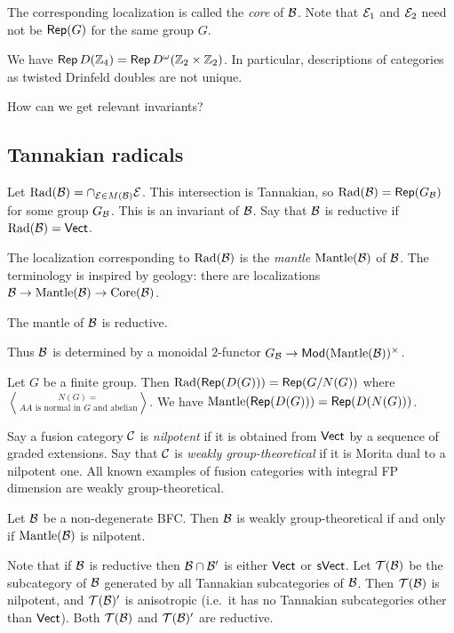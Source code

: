 \documentclass{amsart}
\begin{document}
The corresponding localization is called the \emph{core} of $\mathcal{B}$.
Note that $\mathcal{E}_1$ and $\mathcal{E}_2$ need not be $\operatorname{\mathsf{Rep}}(G)$ for the same group $G$.

\begin{ex}
  We have $\operatorname{\mathsf{Rep}} D(\mathbb{Z}_4) = \operatorname{\mathsf{Rep}} D^\omega(\mathbb{Z}_2 \times \mathbb{Z}_2)$.
  In particular, descriptions of categories as twisted Drinfeld doubles are not unique.
\end{ex}

How can we get relevant invariants?

\subsection{Tannakian radicals}

Let $\operatorname{Rad}(\mathcal{B}) = \cap_{\mathcal{E} \in M(\mathcal{B})} \mathcal{E}$.
This intersection is Tannakian, so $\operatorname{Rad}(\mathcal{B}) = \operatorname{\mathsf{Rep}}(G_{\mathcal{B}})$ for some group $G_{\mathcal{B}}$.
This is an invariant of $\mathcal{B}$.
Say that $\mathcal{B}$ is reductive if $\operatorname{Rad}(\mathcal{B}) = \mathsf{Vect}$.

The localization corresponding to $\operatorname{Rad}(\mathcal{B})$ is the \emph{mantle} $\operatorname{Mantle}(\mathcal{B})$ of $\mathcal{B}$.
The terminology is inspired by geology: there are localizations $\mathcal{B} \to \operatorname{Mantle}(\mathcal{B}) \to \operatorname{Core}(\mathcal{B})$.

\begin{thm}
  The mantle of $\mathcal{B}$ is reductive.
\end{thm}

Thus $\mathcal{B}$ is determined by a monoidal $2$-functor $G_{\mathcal{B}} \to \mathsf{Mod}(\operatorname{Mantle}(\mathcal{B}))^\times$.

\begin{ex}
  Let $G$ be a finite group.
  Then $\operatorname{Rad}(\operatorname{\mathsf{Rep}}(D(G))) = \operatorname{\mathsf{Rep}}(G / N(G))$ where $N(G) = \bangle{A}{A \textrm{ is normal in $G$ and abelian}}$.
  We have $\operatorname{Mantle}(\operatorname{\mathsf{Rep}}(D(G))) = \operatorname{\mathsf{Rep}}(D(N(G)))$.
\end{ex}

Say a fusion category $\mathcal{C}$ is \emph{nilpotent} if it is obtained from $\mathsf{Vect}$ by a sequence of graded extensions.
Say that $\mathcal{C}$ is \emph{weakly group-theoretical} if it is Morita dual to a nilpotent one.
All known examples of fusion categories with integral FP dimension are weakly group-theoretical.

\begin{thm}
  Let $\mathcal{B}$ be a non-degenerate BFC.
  Then $\mathcal{B}$ is weakly group-theoretical if and only if $\operatorname{Mantle}(\mathcal{B})$ is nilpotent.
\end{thm}

Note that if $\mathcal{B}$ is reductive then $\mathcal{B} \cap \mathcal{B}'$ is either $\mathsf{Vect}$ or $\mathsf{sVect}$.
Let $\mathcal{T}(\mathcal{B})$ be the subcategory of $\mathcal{B}$ generated by all Tannakian subcategories of $\mathcal{B}$.
Then $\mathcal{T}(\mathcal{B})$ is nilpotent, and $\mathcal{T}(\mathcal{B})'$ is anisotropic (i.e.\ it has no Tannakian subcategories other than $\mathsf{Vect}$).
Both $\mathcal{T}(\mathcal{B})$ and $\mathcal{T}(\mathcal{B})'$ are reductive.
\end{document}
